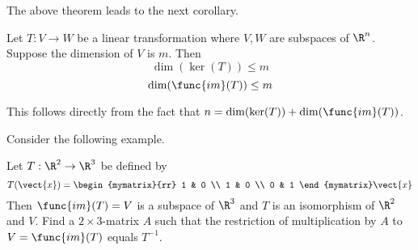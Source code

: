 The above theorem leads to the next corollary.

\begin{corollary}{}{}
Let $T:V\rightarrow W$ be a linear transformation where $V,W$ are subspaces of $\R^n$. Suppose the dimension of $V$ is $m$. Then 
\[
\dim (\ker (T)) \leq m
\]
\[
\dim (\func{im}(T)) \leq m
\]
\end{corollary}

This follows directly from the fact that $n=\dim (\ker (T)) +\dim (\func{im}(
T))$.

Consider the following example.

\begin{example}{}{}
Let $T:\R^{2}\rightarrow \R^{3}$ be defined by 
\begin{equation*}
T(\vect{x})=\begin{mymatrix}{rr}
1 & 0 \\ 
1 & 0 \\ 
0 & 1
\end{mymatrix} \vect{x}
\end{equation*}
Then $\func{im}(T) =V$ is a subspace of $\R^{3}$ and $T$
is an isomorphism of $\R^{2}$ and $V$. Find a $2\times 3$-matrix $A$
such that the restriction of multiplication by $A$ to $V=\func{im}(
T) $ equals $T^{-1}$. 
\end{example}

